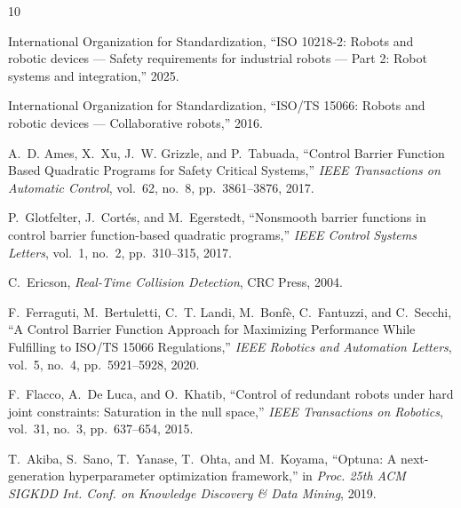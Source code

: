 \documentclass[10pt,twocolumn,a4paper]{article}
\begin{document}
\begin{thebibliography}{10}

International Organization for Standardization, ``ISO 10218-2: Robots and robotic devices --- Safety requirements for industrial robots --- Part 2: Robot systems and integration,'' 2025.

International Organization for Standardization, ``ISO/TS 15066: Robots and robotic devices --- Collaborative robots,'' 2016.

A.~D. Ames, X.~Xu, J.~W. Grizzle, and P.~Tabuada, ``Control Barrier Function Based Quadratic Programs for Safety Critical Systems,'' \textit{IEEE Transactions on Automatic Control}, vol.~62, no.~8, pp.~3861--3876, 2017.

P.~Glotfelter, J.~Cort{\'e}s, and M.~Egerstedt, ``Nonsmooth barrier functions in control barrier function-based quadratic programs,'' \textit{IEEE Control Systems Letters}, vol.~1, no.~2, pp.~310--315, 2017.

C.~Ericson, \textit{Real-Time Collision Detection}, CRC Press, 2004.

F.~Ferraguti, M.~Bertuletti, C.~T. Landi, M.~Bonf{\`e}, C.~Fantuzzi, and C.~Secchi, ``A Control Barrier Function Approach for Maximizing Performance While Fulfilling to ISO/TS 15066 Regulations,'' \textit{IEEE Robotics and Automation Letters}, vol.~5, no.~4, pp.~5921--5928, 2020.

F.~Flacco, A.~De Luca, and O.~Khatib, ``Control of redundant robots under hard joint constraints: Saturation in the null space,'' \textit{IEEE Transactions on Robotics}, vol.~31, no.~3, pp.~637--654, 2015.

T.~Akiba, S.~Sano, T.~Yanase, T.~Ohta, and M.~Koyama, ``Optuna: A next-generation hyperparameter optimization framework,'' in \textit{Proc. 25th ACM SIGKDD Int. Conf. on Knowledge Discovery \& Data Mining}, 2019.

\end{thebibliography}
\end{document}
